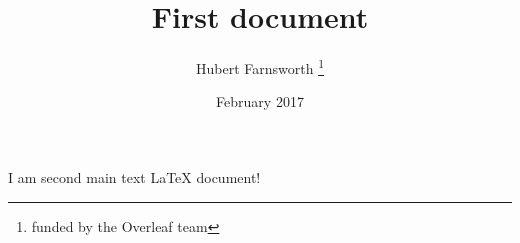 \documentclass[12pt, letterpaper, twoside]{article}
\title{First document}
\author{Hubert Farnsworth \thanks{funded by the Overleaf team}}
\date{February 2017}
\begin{document}
\maketitle

I am second main text \LaTeX{} document!
\end{document}
